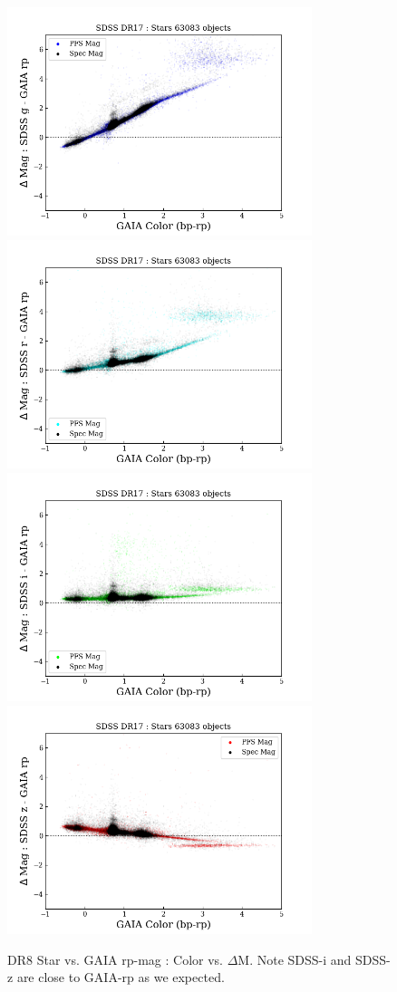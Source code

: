 \documentclass[apj,twocolumn]{aastex631}
\begin{document}
\begin{figure}%
\begin{center}
\includegraphics[angle=0,width=8.9cm]{figures/20220812_color_dmag_g_rp_dr17star.png}
\includegraphics[angle=0,width=8.9cm]{figures/20220812_color_dmag_r_rp_dr17star.png}
\includegraphics[angle=0,width=8.9cm]{figures/20220812_color_dmag_i_rp_dr17star.png}
\includegraphics[angle=0,width=8.9cm]{figures/20220812_color_dmag_z_rp_dr17star.png}
\caption{DR8 Star vs. GAIA rp-mag : Color vs. $\Delta$M.  Note SDSS-i and SDSS-z are close to GAIA-rp as we expected.}
\end{center}
\end{figure}
\end{document}
